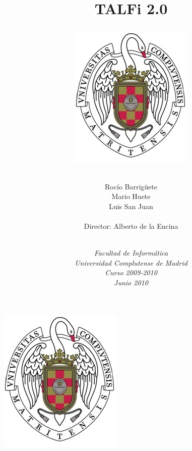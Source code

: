 \documentclass[12pt,a4paper,spanish]{book}
\begin{document}
\title{\huge{\bf{TALFi 2.0}}\\
\begin{center}
\includegraphics{escudo.jpg}
\end{center}}

\author{
Roc\'io Barrig\"{u}ete \\
Mario Huete \\
Luis San Juan \\
\\
Director: Alberto de la Encina \\
\\
}

\date{\em{Facultad de Inform\'atica \\ 
Universidad Complutense de Madrid \\ 
Curso 2009-2010 \\
Junio 2010 \\}}


\maketitle
\newpage
\begin{center}
\includegraphics[scale=0.4]{escudo.jpg}\\
\end{center}
\end{document}
